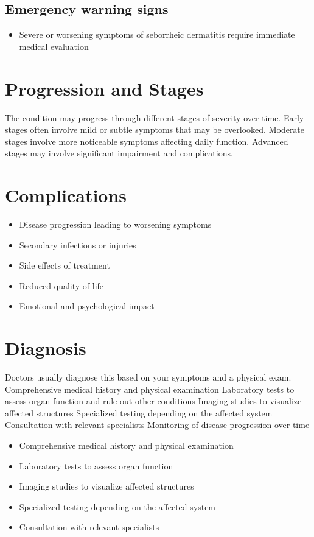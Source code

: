\subsection{Emergency warning signs}
\begin{itemize}[noitemsep]
  \item Severe or worsening symptoms of seborrheic dermatitis require immediate medical evaluation
\end{itemize}
\section{Progression and Stages}
The condition may progress through different stages of severity over time. Early stages often involve mild or subtle symptoms that may be overlooked. Moderate stages involve more noticeable symptoms affecting daily function. Advanced stages may involve significant impairment and complications.
\section{Complications}
\begin{itemize}[noitemsep]
  \item Disease progression leading to worsening symptoms
  \item Secondary infections or injuries
  \item Side effects of treatment
  \item Reduced quality of life
  \item Emotional and psychological impact
\end{itemize}
\section{Diagnosis}
Doctors usually diagnose this based on your symptoms and a physical exam. Comprehensive medical history and physical examination Laboratory tests to assess organ function and rule out other conditions Imaging studies to visualize affected structures Specialized testing depending on the affected system Consultation with relevant specialists Monitoring of disease progression over time

\begin{itemize}[noitemsep]
  \item Comprehensive medical history and physical examination
  \item Laboratory tests to assess organ function
  \item Imaging studies to visualize affected structures
  \item Specialized testing depending on the affected system
  \item Consultation with relevant specialists
\end{itemize}
